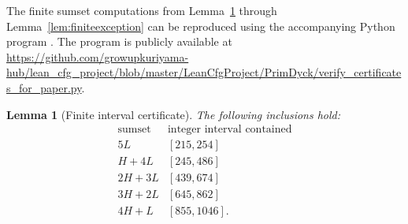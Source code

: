 \documentclass[12pt]{article}
\theoremstyle{plain}
\newtheorem{lemma}[theorem]{Lemma}
\begin{document}
The finite sumset computations from Lemma~\ref{lem:finitefive} through
Lemma~\ref{lem:finiteexception} can be reproduced using the accompanying
Python program .
The program is publicly available at
\url{https://github.com/growupkuriyama-hub/lean_cfg_project/blob/master/LeanCfgProject/PrimDyck/verify_certificates_for_paper.py}.

\begin{lemma}[Finite interval certificate]\label{lem:finitefive}
The following inclusions hold:
\[
\begin{array}{c|c}
\text{sumset}&\text{integer interval contained}\\ \hline
5L &[215,254]\\
H+4L &[245,486]\\
2H+3L &[439,674]\\
3H+2L &[645,862]\\
4H+L &[855,1046].
\end{array}
\]
\end{lemma}
\end{document}

